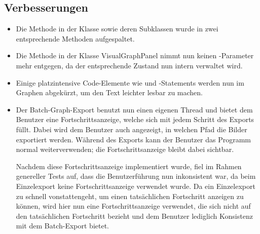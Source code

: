 \subsection{Verbesserungen}
\begin{itemize}
  \item Die Methode  in der Klasse  sowie deren Subklassen wurde in zwei entsprechende Methoden aufgespaltet.
  \item Die Methode  in der Klasse VisualGraphPanel nimmt nun keinen -Parameter mehr entgegen, da der entsprechende Zustand nun intern verwaltet wird.
  \item Einige platzintensive Code-Elemente wie  und -Statements werden nun im Graphen abgekürzt, um den Text leichter lesbar zu machen.
  \item Der Batch-Graph-Export benutzt nun einen eigenen Thread und bietet dem Benutzer eine Fortschrittsanzeige, welche sich mit jedem Schritt des Exports füllt.
        Dabei wird dem Benutzer auch angezeigt, in welchen Pfad die Bilder exportiert werden.
        Während des Exports kann der Benutzer das Programm normal weiterverwenden; die Fortschrittsanzeige bleibt dabei sichtbar.
        
        Nachdem diese Fortschrittsanzeige implementiert wurde, fiel im Rahmen genereller Tests auf, dass die Benutzerführung nun inkonsistent war, da beim Einzelexport keine Fortschrittsanzeige verwendet wurde.
        Da ein Einzelexport zu schnell vonstattengeht, um einen tatsächlichen Fortschritt anzeigen zu können, wird hier nun eine Fortschrittsanzeige verwendet, die sich nicht auf den tatsächlichen Fortschritt bezieht und dem Benutzer lediglich Konsistenz mit dem Batch-Export bietet.
\end{itemize}
